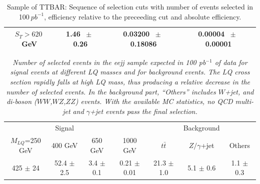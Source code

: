 \begin{table}[htbp]
\begin{center}
\begin{tabular}{|c|c|c|c|}
          $ S_T>620~$GeV           &           1.46          $~\pm~$          0.26           &           0.03200          $~\pm~$          0.18086           &           0.00004          $~\pm~$          0.00001          \\          
          \hline\hline 
\end{tabular} 
\end{center} 
\caption{Sample of TTBAR: Sequence of selection cuts with number of events selected in 100$~pb^{-1}$, efficiency relative to the preceeding cut and absolute efficiency.} 
\label{tab:} 
\end{table} 







\begin{table}[htbp]
\begin{center}
\begin{tabular}{|cccc||ccc|}
\hline
                 &   Signal&         &          & & Background & \\
$M_{LQ}$=250 GeV & 400 GeV & 650 GeV & 1000 GeV & $t\bar{t}$  & $Z/\gamma$+jet & Others \\
\hline
425 $\pm$ 24 & 52.4 $\pm$ 2.5 & 3.4 $\pm$ 0.1 & 0.21 $\pm$ 0.01 & 21.3 $\pm$ 1.0 & 5.1 $\pm$ 0.6 & 1.1 $\pm$ 0.3 \\
\hline
\end{tabular}
\end{center}
\caption{\small \sl Number of selected events in the eejj sample expected in 100 pb$^{-1}$ of data for signal events at different LQ masses 
and for background events. 
The LQ cross section rapidly falls at high LQ mass, thus 
producing a relative decrease in the number of selected events. 
In the background part, ``Others'' includes $W$+jet, and 
di-boson ($WW$,$WZ$,$ZZ$) events. 
With the available MC statistics, no QCD multi-jet and $\gamma$+jet events pass the final selection.}
\label{tab:EventSelSummary}
\end{table}


%
